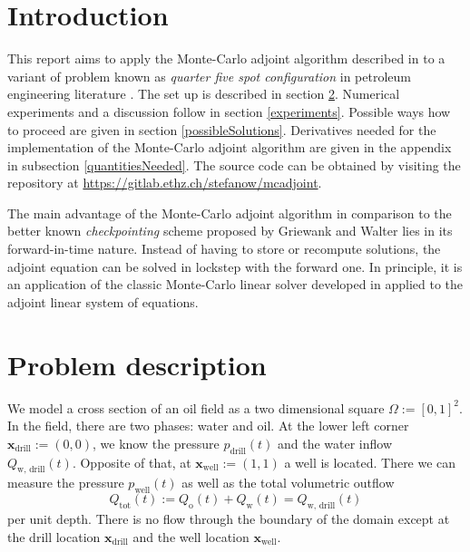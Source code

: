 \documentclass[conference]{IEEEtran}
\renewcommand*{\vec}[1]{\ensuremath{{\bm{#1}}}}
\begin{document}
\section{Introduction}
This report aims to apply the Monte-Carlo adjoint algorithm described in \cite{unsteady} to a variant of problem known as \emph{quarter five spot configuration} in petroleum engineering literature \cite{quarterFiveSpot}. The set up is described in section \ref{problemDescription}.
Numerical experiments and a discussion follow in section \ref{experiments}. Possible ways how to proceed are given in section \ref{possibleSolutions}. Derivatives needed for the implementation of the Monte-Carlo adjoint algorithm are given in the appendix in subsection \ref{quantitiesNeeded}. The source code can be obtained by visiting the repository at
\href{https://gitlab.ethz.ch/stefanow/mcadjoint}{https://gitlab.ethz.ch/stefanow/mcadjoint}.

The main advantage of the Monte-Carlo adjoint algorithm in comparison to the better known \emph{checkpointing} scheme proposed by Griewank and Walter \cite{checkpointing} lies in its forward-in-time nature. Instead of having to store or recompute solutions, the adjoint equation can be solved in lockstep with the forward one.
In principle, it is an application of the classic Monte-Carlo linear solver developed in \cite{forsythe} applied to the adjoint linear system of equations.

\section{Problem description}
\label{problemDescription}
We model a cross section of an oil field as a two dimensional square $\Omega := [0, 1]^2.$ In the field, there are two phases: water and oil. 
At the lower left corner $\vec{x}_\text{drill} := (0, 0)$, we know the pressure $p_\text{drill}(t)$ and the water inflow $Q_\text{w, drill}(t).$ Opposite of that, at $\vec{x}_\text{well} := (1, 1)$ a well is located.
There we can measure the pressure $p_\text{well}(t)$ as well as the total volumetric outflow \begin{equation}
{Q}_\text{tot}(t) := {Q}_\text{o}(t) + {Q}_\text{w}(t) = Q_\text{w, drill}(t)
\end{equation} per unit depth.
There is no flow through the boundary of the domain except at the drill location $\vec{x}_\text{drill}$ and the well location $\vec{x}_\text{well}.$
\end{document}
